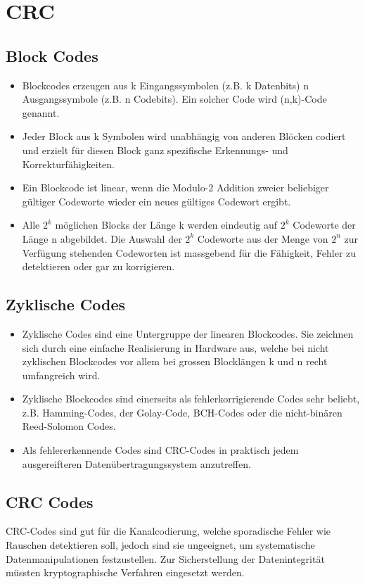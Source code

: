 \section{CRC}


\subsection{Block Codes}

\begin{itemize}
	\item	Blockcodes erzeugen aus k Eingangssymbolen (z.B. k Datenbits) n Ausgangssymbole (z.B. n Codebits). Ein solcher Code wird (n,k)-Code genannt.	
	\item Jeder Block aus k Symbolen wird unabhängig von anderen Blöcken codiert und erzielt für diesen Block ganz spezifische Erkennungs- und Korrekturfähigkeiten.
	\item Ein Blockcode ist linear, wenn die Modulo-2 Addition zweier beliebiger gültiger Codeworte wieder ein neues gültiges Codewort ergibt.
	\item Alle $2^k$ möglichen Blocks der Länge k werden eindeutig auf $2^k$ Codeworte der Länge n abgebildet. Die Auswahl der $2^k$ Codeworte aus der Menge von $2^n$ zur Verfügung stehenden Codeworten ist massgebend für die Fähigkeit, Fehler zu detektieren oder gar zu korrigieren.
\end{itemize}


\subsection{Zyklische Codes}
\begin{itemize}
	\item Zyklische Codes sind eine Untergruppe der linearen Blockcodes. Sie zeichnen sich durch eine einfache Realisierung in Hardware aus, welche bei nicht zyklischen Blockcodes vor allem bei grossen Blocklängen k und n recht umfangreich wird.
	\item Zyklische Blockcodes sind einerseits als fehlerkorrigierende Codes sehr beliebt, z.B. Hamming-Codes, der Golay-Code, BCH-Codes oder die nicht-binären Reed-Solomon Codes.
	\item Als fehlererkennende Codes sind CRC-Codes in praktisch jedem ausgereifteren
	Datenübertragungssystem anzutreffen.	
\end{itemize}

\subsection{CRC Codes}
CRC-Codes sind gut für die Kanalcodierung, welche sporadische Fehler wie Rauschen detektieren soll, jedoch sind sie ungeeignet, um systematische Datenmanipulationen festzustellen. Zur Sicherstellung der Datenintegrität müssten kryptographische Verfahren eingesetzt werden.

